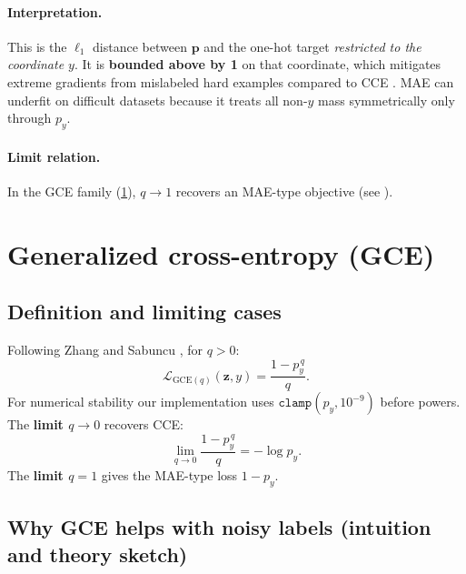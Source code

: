 \documentclass[11pt,a4paper]{article}
\begin{document}
\paragraph{Interpretation.}
This is the $\ell_1$ distance between $\mathbf{p}$ and the one-hot target \emph{restricted to the coordinate $y$}. It is \textbf{bounded above by 1} on that coordinate, which mitigates extreme gradients from mislabeled hard examples compared to CCE \cite{zhang2018gce}. MAE can underfit on difficult datasets because it treats all non-$y$ mass symmetrically only through $p_y$.

\paragraph{Limit relation.}
In the GCE family (\cref{sec:gce}), $q \to 1$ recovers an MAE-type objective (see \cite{zhang2018gce}).

\section{Generalized cross-entropy (GCE)}
\label{sec:gce}

\subsection{Definition and limiting cases}

Following Zhang and Sabuncu \cite{zhang2018gce}, for $q > 0$:
\begin{equation}
  \mathcal{L}_{\mathrm{GCE}(q)}(\mathbf{z}, y) = \frac{1 - p_y^{\,q}}{q}.
\end{equation}
For numerical stability our implementation uses $\texttt{clamp}(p_y, 10^{-9})$ before powers. The \textbf{limit $q \to 0$} recovers CCE:
\begin{equation}
  \lim_{q \to 0} \frac{1 - p_y^{\,q}}{q} = -\log p_y .
\end{equation}
The \textbf{limit $q = 1$} gives the MAE-type loss $1 - p_y$.

\subsection{Why GCE helps with noisy labels (intuition and theory sketch)}
\end{document}
